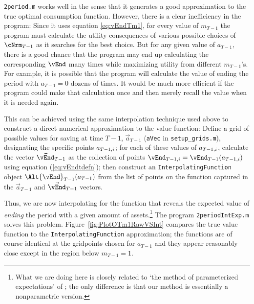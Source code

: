\documentclass[titlepage, headings=optiontotocandhead]{\econtex}
\begin{document}
\texttt{2period.m} works well in the sense that it
generates a good approximation to the true optimal consumption
function.  However, there is a clear inefficiency in the program:
Since it uses equation \eqref{eq:vEndTm1}, for every value
of ${m}_{T-1}$ the program must calculate the utility consequences of
various possible choices of $\cNrm_{T-1}$ as it searches for the best choice.
 But for any given value of ${a}_{T-1}$,
there is a good chance that the program may end up calculating the
corresponding $\vEnd$ many times while maximizing utility from different
${m}_{T-1}$'s.  For example, it is possible that the program will
calculate the value of ending the period with ${a}_{T-1}=0$ dozens of times.  It would
be much more efficient if the program could make that calculation once
and then merely recall the value when it is needed again.

This can be achieved using the same interpolation technique used above
to construct a direct numerical approximation to the value function:
Define a grid of possible values for saving at time $T-1$,
$\vec{a}_{T-1}$
(\texttt{aVec}
in \texttt{setup\_grids.m}), designating the
specific points $\null{a}_{T-1,i}$; for each of these values of
$\null{a}_{T-1,i}$, calculate the vector $\vec{\vEnd}_{T-1}$ as the collection of points $\vEnd_{T-1,i} =
\vEnd_{T-1}(\null{a}_{T-1,i})$ using equation
(\ref{eq:vEndtdefn}); then construct an
\texttt{InterpolatingFunction} object
$\Alt{\vEnd}_{T-1}({a}_{T-1})$ from the list of 
points on the function captured in the $\vec{a}_{T-1}$ and $\vec{\vEnd}_{T-1}$ vectors.

Thus, we are now interpolating for the function 
that reveals the expected value of \textit{ending} the period with a given amount
of assets.\footnote{What we are doing here is closely related to `the
  method of parameterized expectations' of
  \cite{denHaanMarcet:parameterized}; the only difference is that our
  method is essentially a nonparametric version.}  The
program \texttt{2periodIntExp.m} solves this problem.  Figure~\ref{fig:PlotOTm1RawVSInt} compares the true value function to the
\texttt{InterpolatingFunction} approximation; the functions are of course
identical at the gridpoints chosen for ${a}_{T-1}$ and they appear
reasonably close except in the region below
${m}_{T-1}=1$.
\end{document}

